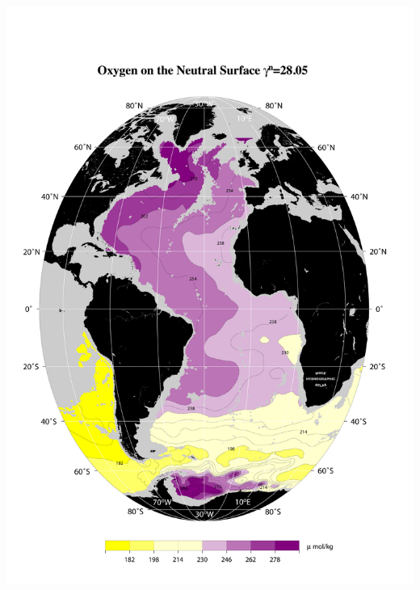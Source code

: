 \documentclass{beamer}
\begin{document}
\begin{frame}[plain,t]
\begin{columns}
\begin{column}{0.5\textwidth}
          \includegraphics[width=\textwidth]{oxygen_isopyc_jpg/gam2805_oxy.jpg}  
      \end{column}
    \end{columns} 
\end{frame}
\end{document}

